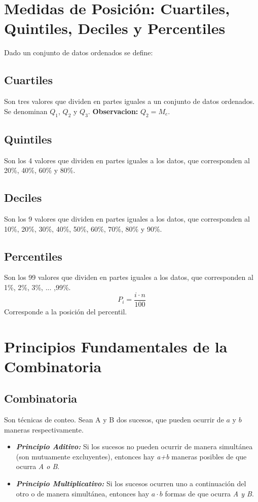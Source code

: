 \documentclass[12pt, letterpaper]{article}
\begin{document}
\section{Medidas de Posición: Cuartiles, Quintiles, Deciles y Percentiles}
Dado un conjunto de datos ordenados se define:

\subsection{Cuartiles}
Son tres valores que dividen en partes iguales a un conjunto de datos ordenados. Se denominan $Q_1$, $Q_2$ y $Q_3$.
\textbf{Observacion:} $Q_2 = M_e$.

\subsection{Quintiles}
Son los 4 valores que dividen en partes iguales a los datos, que corresponden al 20\%, 40\%, 60\% y 80\%.

\subsection{Deciles}
Son los 9 valores que dividen en partes iguales a los datos, que corresponden al 10\%, 20\%, 30\%, 40\%, 50\%, 60\%, 70\%, 80\% y 90\%.


\subsection{Percentiles}
Son los 99 valores que dividen en partes iguales a los datos, que corresponden al 1\%, 2\%, 3\%, ... ,99\%.
\[ P_i= \frac{i \cdot n}{100} \] Corresponde a la posición del percentil.
\newpage

\section{Principios Fundamentales de la Combinatoria}
\subsection{Combinatoria}
Son técnicas de conteo. Sean A y B dos sucesos, que pueden ocurrir de $a$ y $b$ maneras respectivamente.
\begin{itemize}
	\item \textbf{\textit{Principio Aditivo:}} Si los sucesos no pueden ocurrir de manera simultánea (son mutuamente excluyentes), entonces hay \textit{a+b} maneras posibles de que ocurra \textit{A o B}.
	\item \textbf{\textit{Principio Multiplicativo:}} Si los sucesos ocurren uno a continuación del otro o de manera simultánea, entonces hay $a \cdot b$ formas de que ocurra \textit{A y B}.
\end{itemize}
\end{document}

